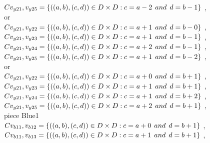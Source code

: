 \\$C{v_{y21},v_{y25}}=\{((a,b),(c,d))\in D\times D: c = a - 2\hspace{1ex} and \hspace{1ex}  d = b - 1 \}$ , 
\\or
\\$C{v_{y21},v_{y22}}=\{((a,b),(c,d))\in D\times D: c = a + 1\hspace{1ex} and \hspace{1ex}  d = b - 0 \}$ , 
\\$C{v_{y21},v_{y23}}=\{((a,b),(c,d))\in D\times D: c = a + 1\hspace{1ex} and \hspace{1ex}  d = b - 1 \}$ , 
\\$C{v_{y21},v_{y24}}=\{((a,b),(c,d))\in D\times D: c = a + 2\hspace{1ex} and \hspace{1ex}  d = b - 1 \}$ , 
\\$C{v_{y21},v_{y25}}=\{((a,b),(c,d))\in D\times D: c = a + 1\hspace{1ex} and \hspace{1ex}  d = b - 2 \}$ , 
\\or
\\$C{v_{y21},v_{y22}}=\{((a,b),(c,d))\in D\times D: c = a + 0\hspace{1ex} and \hspace{1ex}  d = b + 1 \}$ , 
\\$C{v_{y21},v_{y23}}=\{((a,b),(c,d))\in D\times D: c = a + 1\hspace{1ex} and \hspace{1ex}  d = b + 1 \}$ , 
\\$C{v_{y21},v_{y24}}=\{((a,b),(c,d))\in D\times D: c = a + 1\hspace{1ex} and \hspace{1ex}  d = b + 2 \}$ , 
\\$C{v_{y21},v_{y25}}=\{((a,b),(c,d))\in D\times D: c = a + 2\hspace{1ex} and \hspace{1ex}  d = b + 1 \}$ , 
\\ piece Blue1 
\\$C{v_{b11},v_{b12}}=\{((a,b),(c,d))\in D\times D: c = a + 0\hspace{1ex} and \hspace{1ex}  d = b + 1 \}$ , 
\\$C{v_{b11},v_{b13}}=\{((a,b),(c,d))\in D\times D: c = a + 1\hspace{1ex} and \hspace{1ex}  d = b + 1 \}$ , 
